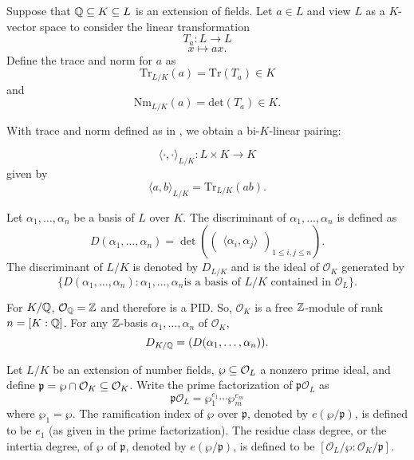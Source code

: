 
\begin{definition}
    Suppose that $\mathbb{Q} \subseteq K \subseteq L$ is an extension of fields. Let $a \in L$ and view $L$ as a $K$-vector space to consider the linear transformation
        \[T_a: L \to L\]
        \[x\mapsto ax. \]
    Define the trace and norm for $a$ as
        \[\textrm{Tr}_{L/K}(a) = \textrm{Tr}(T_a) \in K\]
    and
        \[\textrm{Nm}_{L/K}(a) = \textrm{det}(T_a) \in K.\]
\end{definition}

With trace and norm defined as in , we obtain a bi-$K$-linear pairing:

    \[\langle \cdot ,\cdot \rangle_{L/K}: L \times K \to K\]
given by
    \[\langle a, b\rangle_{L/K} = \textrm{Tr}_{L/K}(ab).\]
\begin{definition}
    Let $\alpha_1, \ldots, \alpha_n$ be a basis of $L$ over $K$. The discriminant of $\alpha_1, \ldots, \alpha_n$ is defined as
        \[D(\alpha_1, \ldots, \alpha_n) = \det\left(\begin{pmatrix}
            \langle \alpha_i, \alpha_j\rangle
        \end{pmatrix}_{1\leq i,j\leq n}\right).\]
    The discriminant of $L/K$ is denoted by $D_{L/K}$ and is the ideal of $\mathcal{O}_{K}$ generated by
        \[\{D(\alpha_1,\ldots, \alpha_n): \alpha_1, \ldots, \alpha_n \textrm{is a basis of $L/K$ contained in $\mathcal{O}_{L}$}\}.\]
\end{definition}


For $K/\mathbb{Q}$, $\mathcal{O}_{\mathbb{Q}} = \mathbb{Z}$ and therefore is a PID. So, $\mathcal{O}_{K}$ is a free $\mathbb{Z}$-module of rank $n = [K:\mathbb{Q}]$. For any $\mathbb{Z}$-basis $\alpha_1, \ldots, \alpha_n$ of $\mathcal{O}_{K}$,
    \[D_{K/\mathbb{Q}} = (D(\alpha_1, \ldots, \alpha_n)).\]

\begin{definition}
    Let $L/K$ be an extension of number fields, $\wp  \subseteq \mathcal{O}_{L}$ a nonzero prime ideal, and define $\mathfrak{p} = \wp \cap \mathcal{O}_{K} \subseteq \mathcal{O}_{K}$. Write the prime factorization of $\mathfrak{p}\mathcal{O}_{L}$ as
    \[\mathfrak{p}\mathcal{O}_{L} = \wp _1^{e_1}\cdots \wp _m^{e_m}\]
    where $\wp _1 = \wp $. The ramification index of $\wp $ over $\mathfrak{p}$, denoted by $e(\wp /\mathfrak{p})$, is defined to be $e_1$ (as given in the prime factorization). The residue class degree, or the intertia degree, of $\wp $ of $\mathfrak{p}$, denoted by $e(\wp /\mathfrak{p})$, is defined to be $[\mathcal{O}_{L}/\wp : \mathcal{O}_{K}/\mathfrak{p}]$.
\end{definition}

